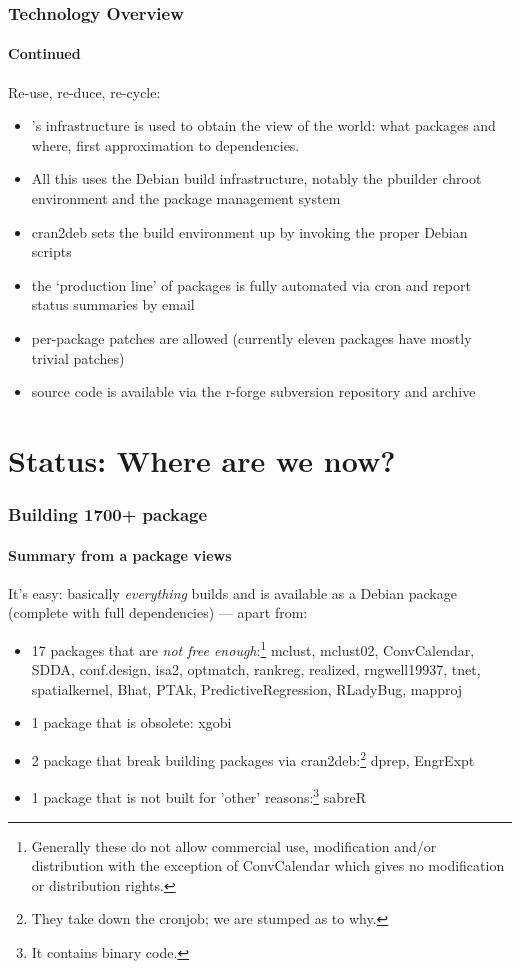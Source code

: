 \documentclass[smaller,compress]{beamer}
\begin{document}
\begin{frame}
  \frametitle{Technology Overview} 
  \framesubtitle{Continued}

  Re-use, re-duce, re-cycle:

  \begin{itemize}
  \item \R's infrastructure is used to obtain the \R view of the world:
    what packages and where, first approximation to dependencies.
  \item All this uses the Debian build infrastructure, notably the
    pbuilder chroot environment and the package management system
  \item cran2deb sets the build environment up by invoking the proper Debian
    scripts 
  \item the `production line' of packages is fully automated via cron and report status
    summaries by email
  \item per-package patches are allowed (currently eleven packages have
    mostly trivial patches)
  \item source code is available via the r-forge subversion repository and archive
  \end{itemize}

\end{frame}

\section[Status]{Status: Where are we now?}

\begin{frame}
  \frametitle{Building 1700+ package}
  \framesubtitle{Summary from a package views}

  It's easy: basically \textsl{everything} builds and is available as a
  Debian package (complete with full dependencies) --- apart from:

  \begin{itemize}
  \item 17 packages that are \textsl{not free enough}:\footnote{Generally these
do not allow commercial use, modification and/or distribution with the
exception of ConvCalendar which gives no modification or distribution rights.}
    mclust, mclust02, ConvCalendar, SDDA, conf.design, isa2, optmatch,
    rankreg, realized, rngwell19937, tnet, spatialkernel, Bhat, PTAk,
    PredictiveRegression, RLadyBug, mapproj 
  \item 1 package that is obsolete: xgobi
  \item 2 package that break building packages via cran2deb:\footnote{They
      take down the cronjob; we are stumped as to why.} dprep, EngrExpt
  \item 1 package that is not built for 'other' reasons:\footnote{It contains
      binary code.} sabreR
  \end{itemize}
\end{frame}
\end{document}
